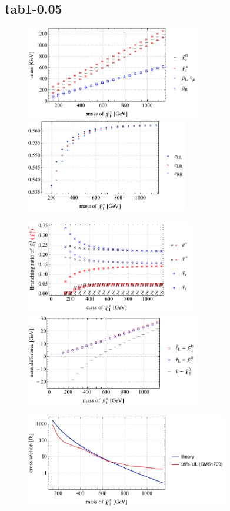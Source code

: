 \documentclass[a4paper,10pt,captions=tableheading,DIV=14]{scrartcl}
\numberwithin{equation}{section}
\begin{document}
\subsection{tab1-0.05}
\begin{figure}[h]
  \centering
  \includegraphics[height=115pt]{../plots/plot_tab1x005_mass.pdf}
  \includegraphics[height=115pt]{../plots/plot_tab1x005_cfactors.pdf}
\par
  \includegraphics[height=115pt]{../plots/plot_tab1x005_br21.pdf}
  \includegraphics[height=115pt]{../plots/plot_tab1x005_massdiff.pdf}
\par
  \includegraphics[height=115pt]{../plots/plot_tab1x005_limit.pdf}


\end{figure}
\end{document}
